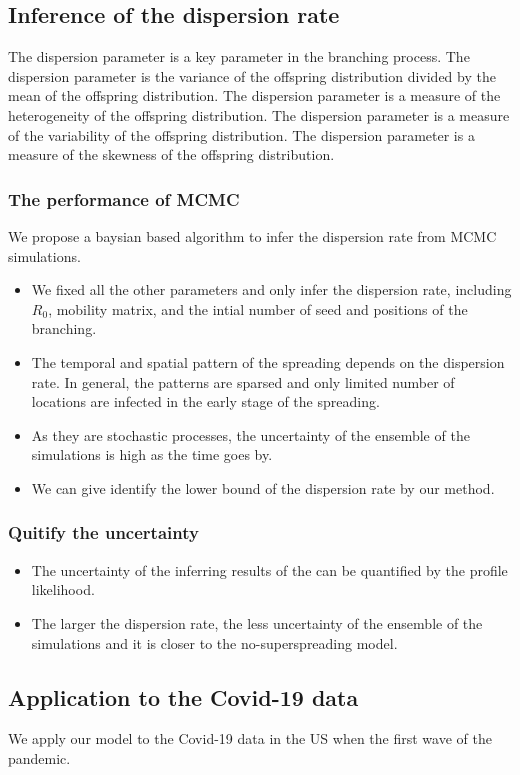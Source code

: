 \documentclass{article}
\begin{document}
\subsection{Inference of the dispersion rate}
The dispersion parameter is a key parameter in the branching process. The dispersion parameter is the variance of the offspring distribution divided by the mean of the offspring distribution. The dispersion parameter is a measure of the heterogeneity of the offspring distribution. The dispersion parameter is a measure of the variability of the offspring distribution. The dispersion parameter is a measure of the skewness of the offspring distribution. 

\subsubsection{The performance of MCMC}
We propose a baysian based algorithm to infer the dispersion rate from MCMC simulations. 
\begin{itemize}
    \item We fixed all the other parameters and only infer the dispersion rate, including $R_{0}$, mobility matrix, and the intial number of seed and positions of the branching.
    \item The temporal and spatial pattern of the spreading depends on the dispersion rate. In general, the patterns are sparsed and only limited number of locations are infected in the early stage of the spreading. 
    \item As they are stochastic processes, the uncertainty of the ensemble of the simulations is high as the time goes by. 
    \item We can give identify the lower bound of the dispersion rate by our method.
\end{itemize}

\subsubsection{Quitify the uncertainty}
\begin{itemize}
    \item The uncertainty of the inferring results of the can be quantified by the profile likelihood.
    \item The larger the dispersion rate, the less uncertainty of the ensemble of the simulations and it is closer to the no-superspreading model.
\end{itemize}

\subsection{Application to the Covid-19 data}
We apply our model to the Covid-19 data in the US when the first wave of the pandemic. 
\end{document}
